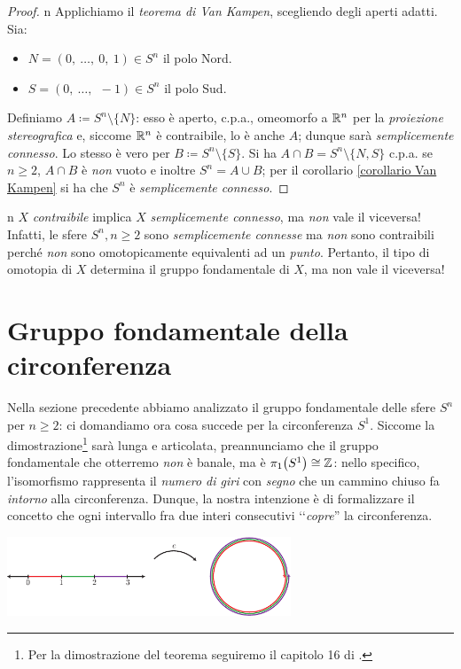 \begin{proof}{n}
	Applichiamo il \textit{teorema di Van Kampen}, scegliendo degli aperti adatti. Sia:
	\begin{itemize}
		\item $N=(0,\ \dots,\ 0,\ 1)\in S^n$ il polo Nord.
		\item $S=(0,\ \dots,\ \ -1)\in S^n$ il polo Sud.
	\end{itemize}
	Definiamo $A\coloneqq S^n\setminus\{N\}$: esso è aperto, c.p.a., omeomorfo a $\mathbb{R}^n$ per la \textit{proiezione stereografica} e, siccome $\mathbb{R}^n$ è contraibile, lo è anche $A$; dunque sarà \textit{semplicemente connesso}. Lo stesso è vero per $B\coloneqq S^n\setminus\{S\}$. Si ha $A\cap B=S^n\setminus\{N, S\}$ c.p.a. se $n\geq 2$, $A\cap B$ è \textit{non} vuoto e inoltre $S^n=A\cup B$; per il corollario \ref{corollario Van Kampen} si ha che $S^n$ è \textit{semplicemente connesso}.
\end{proof}
\begin{warning}{n}
	$X$ \textit{contraibile} implica $X$ \textit{semplicemente connesso}, ma \textit{non} vale il viceversa! Infatti, le sfere $S^n, n\geq 2$ sono \textit{semplicemente connesse} ma \textit{non} sono contraibili perché \textit{non} sono omotopicamente equivalenti ad un \textit{punto}. Pertanto, il tipo di omotopia di $X$ determina il gruppo fondamentale di $X$, ma non vale il viceversa!
\end{warning}
\section{Gruppo fondamentale della circonferenza}
Nella sezione precedente abbiamo analizzato il gruppo fondamentale delle sfere $S^n$ per $n\geq 2$: ci domandiamo ora cosa succede per la circonferenza $S^1$. Siccome la dimostrazione\footnote{Per la dimostrazione del teorema seguiremo il capitolo 16 di \cite{kosniowski:1980firstlook}.} sarà lunga e articolata, preannunciamo che il gruppo fondamentale che otterremo \textit{non} è banale, ma è $\homotopy[1]{S^1}\cong \Z$: nello specifico, l'isomorfismo rappresenta il \textit{numero di giri} con \textit{segno} che un cammino chiuso fa \textit{intorno} alla circonferenza. Dunque, la nostra intenzione è di formalizzare il concetto che ogni intervallo fra due interi consecutivi ‘‘\textit{copre}'' la circonferenza.
\begin{center}
	\includegraphics[width=240pt]{images/slinky-eps-converted-to.pdf}
\end{center}
